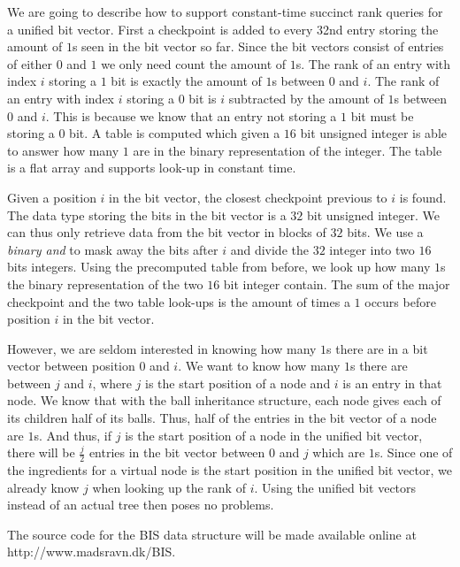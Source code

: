 We are going to describe how to support constant-time succinct rank queries for a unified bit vector. First a checkpoint is added to every 32nd entry storing the amount of $1$s seen in the bit vector so far. Since the bit vectors consist of entries of either $0$ and $1$ we only need count the amount of $1$s. The rank of an entry with index $i$ storing a $1$ bit is exactly the amount of $1$s between $0$ and $i$. The rank of an entry with index $i$ storing a $0$ bit is $i$ subtracted by the amount of $1$s between $0$ and $i$. This is because we know that an entry not storing a $1$ bit must be storing a $0$ bit. A table is computed which given a $16$ bit unsigned integer is able to answer how many $1$ are in the binary representation of the integer. The table is a flat array and supports look-up in constant time.

Given a position $i$ in the bit vector, the closest checkpoint previous to $i$ is found. The data type storing the bits in the bit vector is a $32$ bit unsigned integer. We can thus only retrieve data from the bit vector in blocks of $32$ bits. We use a \emph{binary and} to mask away the bits after $i$ and divide the $32$ integer into two $16$ bits integers. Using the precomputed table from before, we look up how many $1$s the binary representation of the two $16$ bit integer contain. The sum of the major checkpoint and the two table look-ups is the amount of times a $1$ occurs before position $i$ in the bit vector. 

However, we are seldom interested in knowing how many $1$s there are in a bit vector between position $0$ and $i$. We want to know how many $1$s there are between $j$ and $i$, where $j$ is the start position of a node and $i$ is an entry in that node. We know that with the ball inheritance structure, each node gives each of its children half of its balls. Thus, half of the entries in the bit vector of a node are $1$s. And thus, if $j$ is the start position of a node in the unified bit vector, there will be $\frac{j}{2}$ entries in the bit vector between $0$ and $j$ which are $1$s. Since one of the ingredients for a virtual node is the start position in the unified bit vector, we already know $j$ when looking up the rank of $i$. Using the unified bit vectors instead of an actual tree then poses no problems.

The source code for the BIS data structure will be made available online at http://www.madsravn.dk/BIS.



